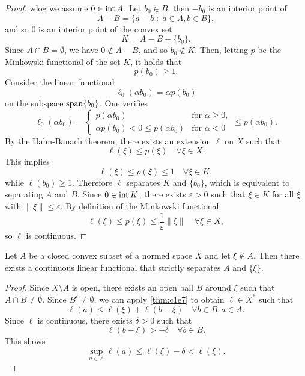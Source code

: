 \documentclass[../skript.tex]{subfiles}
\begin{document}
\begin{proof}
\Ac{wlog} we assume $0 \in \operatorname{int} A$. Let $b_0 \in B$, then $-b_0$ is an interior point of 
\[
	A - B = \{ a - b \; : \; a \in A, b \in B \},
\]
and so $0$ is an interior point of the convex set
\[
	K = A - B + \{ b_0 \}.
\]
Since $A \cap B = \emptyset$, we have $0 \notin A - B$, and so $b_0 \notin K$. Then, letting $p$ be the Minkowski functional of the set $K$, it holds that
\[
	p(b_0) \geq 1.
\]
Consider the linear functional
\[
\ell_0(\alpha b_0) = \alpha p(b_0)
\]
on the subspace $\operatorname*{span}\{b_0\}$.
One verifies
\[
	\ell_0(\alpha b_0) = \begin{cases}
	p(\alpha b_0) & \text{for } \alpha \geq 0, \\
	\alpha p(b_0) < 0 \leq p(\alpha b_0) & \text{for } \alpha < 0 
	\end{cases} \leq p(\alpha b_0).
\]
By the Hahn-Banach theorem, there exists an extension $\ell$ on $X$ such that
\[
	\ell(\xi) \leq p(\xi) \quad \forall \xi \in X.
\]
This implies
\[
	\ell(\xi) \leq p(\xi) \leq 1 \quad \forall \xi \in K,
\]
while $\ell(b_0) \geq 1$.
Therefore $\ell$ separates $K$ and $\{ b_0 \}$, which is equivalent to separating $A$ and $B$.
Since $0 \in \operatorname{int} K$, there exists $\varepsilon > 0$ such that $\xi \in K$ for all $\xi$ with $\| \xi \| \leq \varepsilon$. By definition of the Minkowski functional
\[
	\ell(\xi) \leq p(\xi) \leq \frac{1}{\varepsilon} \| \xi \| \quad \forall \xi \in X,
\]
so $\ell$ is continuous.
\end{proof}
\begin{theorem} %
\label{thm:c1e8}
Let $A$ be a closed convex subset of a normed space $X$ and let $\xi \notin A$. Then there exists a continuous linear functional that strictly separates $A$ and $\{ \xi \}$.
\end{theorem}
\begin{proof}
Since $X \setminus A$ is open, there exists an open ball $B$ around $\xi$ such that $A \cap B \neq \emptyset$. Since $B^\circ \neq \emptyset$, we can apply \cref{thm:c1e7} to obtain $\ell \in X^*$ such that
\[
	\ell(a) \leq \ell(\xi) + \ell(b - \xi) \quad \forall b \in B, a \in A.
\]
Since $\ell$ is continuous, there exists $\delta > 0$ such that
\[
	\ell(b - \xi) > - \delta \quad \forall b \in B.
\]
This shows
\[
	\sup_{a \in A} \ell(a) \leq \ell(\xi) - \delta < \ell(\xi).
\]
\end{proof}
\end{document}
